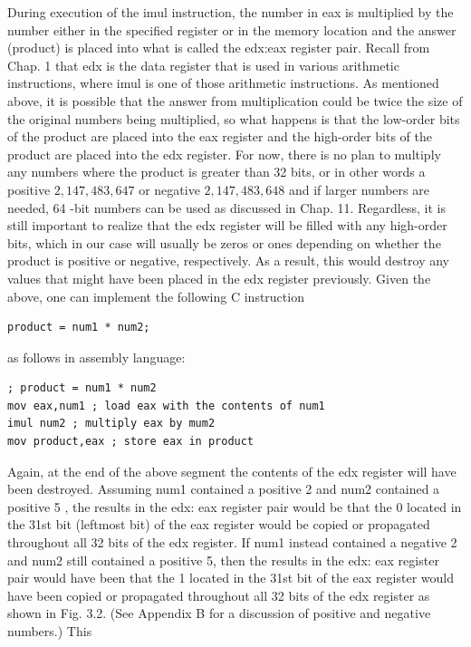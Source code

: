 \documentclass[10pt]{article}
\begin{document}
During execution of the imul instruction, the number in eax is multiplied by the number either in the specified register or in the memory location and the answer (product) is placed into what is called the edx:eax register pair. Recall from Chap. 1 that edx is the data register that is used in various arithmetic instructions, where imul is one of those arithmetic instructions. As mentioned above, it is possible that the answer from multiplication could be twice the size of the original numbers being multiplied, so what happens is that the low-order bits of the product are placed into the eax register and the high-order bits of the product are placed into the edx register. For now, there is no plan to multiply any numbers where the product is greater than 32 bits, or in other words a positive $2,147,483,647$ or negative $2,147,483,648$ and if larger numbers are needed, 64 -bit numbers can be used as discussed in Chap. 11. Regardless, it is still important to realize that the edx register will be filled with any high-order bits, which in our case will usually be zeros or ones depending on whether the product is positive or negative, respectively. As a result, this would destroy any values that might have been placed in the edx register previously. Given the above, one can implement the following C instruction

\begin{verbatim}
product = num1 * num2;
\end{verbatim}

as follows in assembly language:

\begin{verbatim}
; product = num1 * num2
mov eax,num1 ; load eax with the contents of num1
imul num2 ; multiply eax by mum2
mov product,eax ; store eax in product
\end{verbatim}

Again, at the end of the above segment the contents of the edx register will have been destroyed. Assuming num1 contained a positive 2 and num2 contained a positive 5 , the results in the edx: eax register pair would be that the 0 located in the 31st bit (leftmost bit) of the eax register would be copied or propagated throughout all 32 bits of the edx register. If num1 instead contained a negative 2 and num2 still contained a positive 5, then the results in the edx: eax register pair would have been that the 1 located in the 31st bit of the eax register would have been copied or propagated throughout all 32 bits of the edx register as shown in Fig. 3.2. (See Appendix B for a discussion of positive and negative numbers.) This
\end{document}
